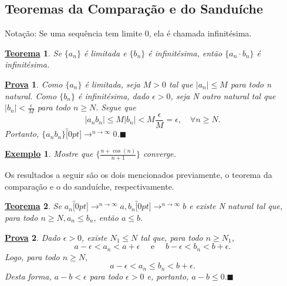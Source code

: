 \documentclass{article}
\newtheorem*{theorem*}{\underline{Teorema}}
\newtheorem{example}{\underline{Exemplo}}
\newtheorem*{proof*}{\underline{Prova}}
\renewcommand\qedsymbol{$\blacksquare$}
\begin{document}
\subsection{Teoremas da Compara\c c\~ao e do Sandu\'iche}
  Nota\c c\~ao: Se uma sequ\^encia tem limite 0, ela \'e chamada infinit\'esima.
\begin{theorem*}
  Se $\{a_{n}\}$ \'e limitada e $\{b_{n}\}$ \'e infinit\'esima, ent\~ao $\{a_{n}\cdot b_{n}\} $ \'e infinit\'esima.
\end{theorem*}
\begin{proof*}
  Como $\{a_{n}\}$ \'e limitada, seja $M > 0$ tal que $|a_{n}|\leq{M}$ para todo n natural. Como $\{b_{n}\} $ \'e infinit\'esima, dado $\epsilon > 0$,
seja N outro natural tal que $|b_{n}|<\frac{\epsilon}{M}$ para todo $n\geq{N}.$ Segue que
  $$
    |a_{n}b_{n}| \leq{M|b_{n}|} < M \frac{\epsilon}{M} = \epsilon,\quad \forall n\geq{N}.
  $$
  Portanto, $\{a_{n}b_{n}\}\overbracket[0pt]{\longrightarrow}^{n\to \infty}0$.\qedsymbol
\end{proof*}
 \begin{example}
   Mostre que $\biggl\{\frac{n+\cos{(n)}}{n+1}\biggr\}$ converge.
 \end{example}
 Os resultados a seguir s\~ao os dois mencionados previamente, o teorema da compara\c c\~ao e o do sandu\'iche, respectivamente.
\begin{theorem*}
  Se $a_{n}\overbracket[0pt]{\longrightarrow}^{n\to \infty}a, b_{n}\overbracket[0pt]{\longrightarrow}^{n\to \infty}b$ e existe N natural tal que, 
para todo $n\geq{N}, a_{n}\leq{b_{n}}$, ent\~ao $a\leq{b}.$
\end{theorem*}
 \begin{proof*}
   Dado $\epsilon > 0$, existe $N_{1}\leq{N}$ tal que, para todo $n\geq{N_{1}}$,
   $$
    a - \epsilon < a_{n} < a + \epsilon\quad\text{ e }\quad b-\epsilon < b_{n} < b + \epsilon.
   $$
   Logo, para todo $n\geq{N},$
   $$
    a-\epsilon < a_{n} \leq{b_{n}} < b + \epsilon.
   $$
   Desta forma, $a-b < \epsilon$ para todo $\epsilon > 0$ e, portanto, $a - b\leq{0}.$\qedsymbol
 \end{proof*}
\end{document}
